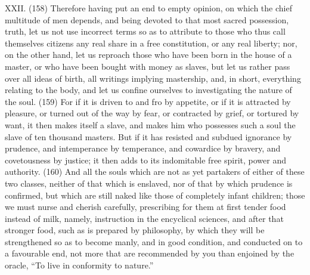XXII. (158) Therefore having put an end to empty opinion, on which the chief multitude of men
depends, and being devoted to that most sacred possession, truth, let us not use incorrect terms
so as to attribute to those who thus call themselves citizens any real share in a free constitution, or
any real liberty; nor, on the other hand, let us reproach those who have been born in the house of a
master, or who have been bought with money as slaves, but let us rather pass over all ideas of
birth, all writings implying mastership, and, in short, everything relating to the body, and let us
confine ourselves to investigating the nature of the soul. (159) For if it is driven to and fro by
appetite, or if it is attracted by pleasure, or turned out of the way by fear, or contracted by grief, or
tortured by want, it then makes itself a slave, and makes him who possesses such a soul the slave
of ten thousand masters. But if it has resisted and subdued ignorance by prudence, and
intemperance by temperance, and cowardice by bravery, and covetousness by justice; it then adds
to its indomitable free spirit, power and authority. (160) And all the souls which are not as yet
partakers of either of these two classes, neither of that which is enslaved, nor of that by which
prudence is confirmed, but which are still naked like those of completely infant children; those we
must nurse and cherish carefully, prescribing for them at first tender food instead of milk, namely,
instruction in the encyclical sciences, and after that stronger food, such as is prepared by
philosophy, by which they will be strengthened so as to become manly, and in good condition, and
conducted on to a favourable end, not more that are recommended by you than enjoined by the
oracle, ``To live in conformity to nature.''


